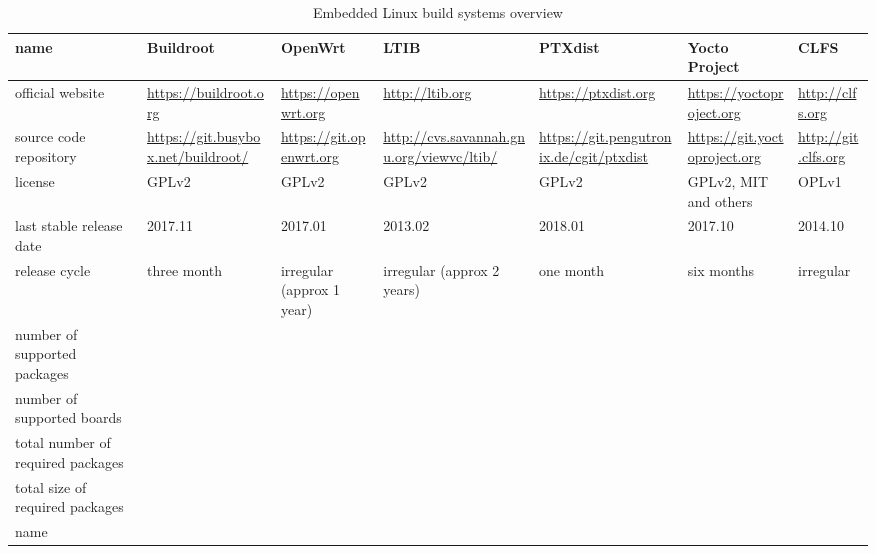 \documentclass[printmode]{mgr}
\begin{document}
\begin{landscape}

\begin{table}
  \begin{tabular}{| p{3cm} | p{3cm} | p{3cm} | p{3cm} | p{3cm} | p{3cm} | p{3cm} |}
    \hline
    name & Buildroot & OpenWrt & LTIB & PTXdist & Yocto Project & CLFS \\
    \hline
    official website & \url{https://buildroot.org} & \url{https://openwrt.org} & \url{http://ltib.org} & \url{https://ptxdist.org} & \url{https://yoctoproject.org} & \url{http://clfs.org}\\
    \hline
    source code repository & \url{https://git.busybox.net/buildroot/} & \url{https://git.openwrt.org} & \url{http://cvs.savannah.gnu.org/viewvc/ltib/} & \url{https://git.pengutronix.de/cgit/ptxdist} & \url{https://git.yoctoproject.org} & \url{http://git.clfs.org} \\
    \hline
    license & GPLv2\cite{web:buildroot-license} & GPLv2\cite{web:openwrt-license} & GPLv2\cite{web:ltib-license} & GPLv2\cite{web:ptxdist-license} & GPLv2, MIT and others\cite{web:yoctoproject-license} & OPLv1\cite{web:clfs-license} \\
    \hline
    last stable release date & 2017.11 & 2017.01 & 2013.02 & 2018.01 & 2017.10 & 2014.10\\
    \hline
    release cycle & three month\cite{web:buildroot-releases} & irregular (approx 1 year) & irregular (approx 2 years)\cite{web:ltib-releases} & one month\cite{web:ptxdist-releases} & six months\cite{web:yoctoproject-releases} & irregular\cite{web:clfs-releases}\\
    \hline
    number of supported packages &  &  &  &  &  & \\
    \hline
    number of supported boards &  &  &  &  &  & \\
    \hline
    total number of required packages &  &  &  &  &  & \\
    \hline
    total size of required packages &  &  &  &  &  & \\
    \hline
    name &  &  &  &  &  & \\
    \hline
  \end{tabular}
  \caption{Embedded Linux build systems overview}
\end{table}








\end{landscape}
\end{document}
